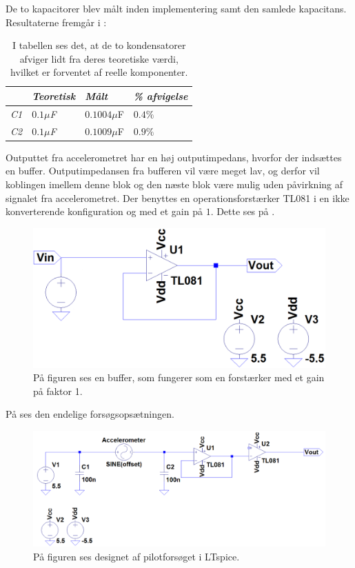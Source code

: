 \noindent De to kapacitorer blev målt inden implementering samt den samlede kapacitans. Resultaterne fremgår i  :
\begin{table}[H]
	\centering
	\begin{tabular}{|l|l|l|l|}\hline
		& \textit{Teoretisk} & \textit{Målt} & \textit{\% afvigelse} \\ \hline
		\textit{C1}       & \textit{$0.1\mu$F} & $0.1004\mu$F  & $0.4\%$               \\ \hline		
		\textit{C2}       & \textit{$0.1\mu$F} & $0.1009\mu$F  & $0.9\%$               \\ \hline
	\end{tabular}
	\caption{I tabellen ses det, at de to kondensatorer afviger lidt fra deres teoretiske værdi, hvilket er forventet af reelle komponenter.}
	\label{Tab:Acc_kondensator}
\end{table}
Outputtet fra accelerometret har en høj outputimpedans, hvorfor der indsættes en buffer. Outputimpedansen fra bufferen vil være meget lav, og derfor vil koblingen imellem denne blok og den næste blok være mulig uden påvirkning af signalet fra accelerometret. Der benyttes en operationsforstærker TL081 i en ikke konverterende konfiguration og med et gain på $1$. Dette ses på .
\begin{figure}[H]
	\centering
	\includegraphics[scale=0.4]{figures/cProblemloesning/Buffer_LT.png}
	\caption{På figuren ses en buffer, som fungerer som en forstærker med et gain på faktor 1.}
	\label{fig:Buffer}
\end{figure}

På  ses den endelige forsøgsopsætningen.
\begin{figure}[H]
	\centering
	\includegraphics[scale=0.4]{figures/Bilag/Acc_medbuffer.png}
	\caption{På figuren ses designet af pilotforsøget i LTspice.}
	\label{pforsoeg1}
\end{figure}

